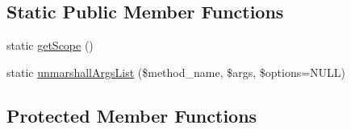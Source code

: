 \subsection*{Static Public Member Functions}
\begin{DoxyCompactItemize}
\item 
static \hyperlink{class_able_polecat___transaction_abstract_ad9ade868bd136d32967059d1cccb3e92}{get\+Scope} ()
\item 
static \hyperlink{class_able_polecat___transaction_abstract_a94d2e558bba777f54dcc10f1bfc4dca5}{unmarshall\+Args\+List} (\$method\+\_\+name, \$args, \$options=N\+U\+L\+L)
\end{DoxyCompactItemize}
\subsection*{Protected Member Functions}
